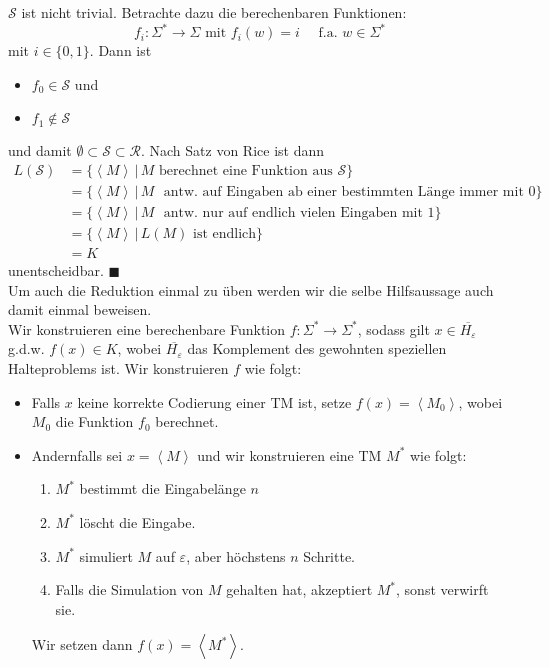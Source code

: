 \documentclass[11pt,a4paper]{article}
\newcommand{\qedb}{\hfill\(\blacksquare\)}
\begin{document}
\( \mathcal{S} \) ist nicht trivial. Betrachte dazu die berechenbaren Funktionen:
\[
	f_i: \Sigma^\ast \to \Sigma \text{ mit } f_i(w) = i \quad\text{ f.a. } w \in \Sigma^\ast
\]
mit \( i \in \{ 0, 1 \} \). Dann ist
\begin{itemize}
	\item \( f_0 \in \mathcal{S} \) und
	\item \( f_1 \notin \mathcal{S} \)
\end{itemize}
und damit \( \emptyset \subset \mathcal{S} \subset \mathcal{R} \). Nach Satz von Rice ist dann
\begin{align*}
	L(\mathcal{S}) &= \{ \left\langle M \right\rangle \,\vert\, M \text{ berechnet eine Funktion aus } \mathcal{S} \}\\
		&= \{ \left\langle M \right\rangle \,\vert\, M \text{ {antw.} auf Eingaben ab einer bestimmten L\"ange immer mit } 0 \}\\
		&= \{ \left\langle M \right\rangle \,\vert\, M \text{ {antw.} nur auf endlich vielen Eingaben mit } 1 \}\\
		&= \{ \left\langle M \right\rangle \,\vert\, L(M) \text{ ist endlich} \}\\
		&= K
\end{align*}
unentscheidbar. \qedb\\[2em]
Um auch die Reduktion einmal zu \"uben werden wir die selbe Hilfsaussage auch damit einmal beweisen.\\
Wir konstruieren eine berechenbare Funktion \( f: \Sigma^\ast \to \Sigma^\ast \), sodass gilt \( x \in \overline{H_\varepsilon} \) {g.d.w.} \( f(x) \in K \), wobei \( \overline{H_\varepsilon} \) das Komplement des gewohnten speziellen Halteproblems ist. Wir konstruieren \( f \) wie folgt:
\begin{itemize}
	\item Falls \( x \) keine korrekte Codierung einer TM ist, setze \( f(x) = \left\langle M_0 \right\rangle \), wobei \( M_0 \) die Funktion \( f_0 \) berechnet.
	\item Andernfalls sei \( x = \left\langle M \right\rangle \) und wir konstruieren eine TM \( M^\ast \) wie folgt:
		\begin{enumerate}
			\item \( M^\ast \) bestimmt die Eingabel\"ange \( n \)
			\item \( M^\ast \) l\"oscht die Eingabe.
			\item \( M^\ast \) simuliert \( M \) auf \( \varepsilon \), aber h\"ochstens \( n \) Schritte.
			\item Falls die Simulation von \( M \) gehalten hat, akzeptiert \( M^\ast \), sonst verwirft sie.
		\end{enumerate}
		Wir setzen dann \( f(x) = \left\langle M^\ast \right\rangle \).
\end{itemize}
\end{document}
